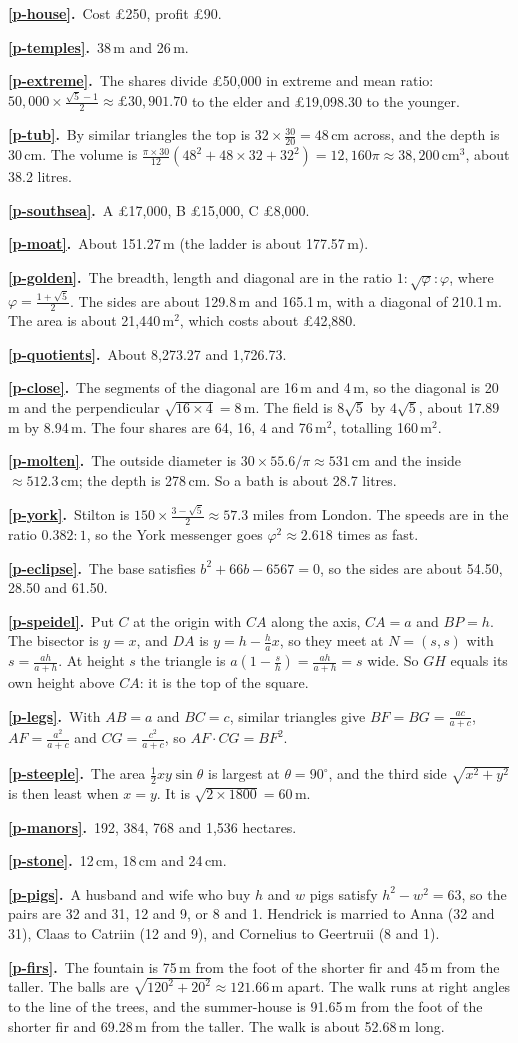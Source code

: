 \documentclass[11pt,a4paper]{article}
\newcommand{\ans}[2]{\par\smallskip\noindent\textbf{\ref{#1}.}\ #2}
\begin{document}
\ans{p-house}{Cost £250, profit £90.}
\ans{p-temples}{38\,m and 26\,m.}
\ans{p-extreme}{The shares divide £50,000 in extreme and mean ratio:
$50{,}000\times\tfrac{\sqrt5-1}{2} \approx £30{,}901.70$ to the elder and £19,098.30 to the
younger.}
\ans{p-tub}{By similar triangles the top is $32\times\tfrac{30}{20} = 48$\,cm across, and
the depth is 30\,cm. The volume is
$\tfrac{\pi\times30}{12}(48^2+48\times32+32^2) = 12{,}160\pi \approx 38{,}200$\,cm$^3$,
about 38.2 litres.}
\ans{p-southsea}{A £17,000, B £15,000, C £8,000.}
\ans{p-moat}{About 151.27\,m (the ladder is about 177.57\,m).}
\ans{p-golden}{The breadth, length and diagonal are in the ratio $1:\sqrt\varphi:\varphi$,
where $\varphi = \tfrac{1+\sqrt5}{2}$. The sides are about 129.8\,m and 165.1\,m, with a
diagonal of 210.1\,m. The area is about 21,440\,m$^2$, which costs about £42,880.}
\ans{p-quotients}{About 8,273.27 and 1,726.73.}
\ans{p-close}{The segments of the diagonal are 16\,m and 4\,m, so the diagonal is
20\,m and the perpendicular $\sqrt{16\times4} = 8$\,m. The field is $8\sqrt5$ by
$4\sqrt5$, about 17.89\,m by 8.94\,m. The four shares are 64, 16, 4 and 76\,m$^2$,
totalling 160\,m$^2$.}
\ans{p-molten}{The outside diameter is $30\times55.6/\pi \approx 531$\,cm and the inside
$\approx 512.3$\,cm; the depth is 278\,cm. So a bath is about 28.7 litres.}
\ans{p-york}{Stilton is $150\times\tfrac{3-\sqrt5}{2} \approx 57.3$ miles from London. The
speeds are in the ratio $0.382:1$, so the York messenger goes $\varphi^2 \approx 2.618$
times as fast.}
\ans{p-eclipse}{The base satisfies $b^2+66b-6567 = 0$, so the sides are about 54.50,
28.50 and 61.50.}
\ans{p-speidel}{Put $C$ at the origin with $CA$ along the axis, $CA = a$ and $BP = h$. The
bisector is $y = x$, and $DA$ is $y = h - \tfrac{h}{a}x$, so they meet at $N = (s,s)$ with
$s = \tfrac{ah}{a+h}$. At height $s$ the triangle is $a\left(1-\tfrac{s}{h}\right) =
\tfrac{ah}{a+h} = s$ wide. So $GH$ equals its own height above $CA$: it is the top of the
square.}
\ans{p-legs}{With $AB = a$ and $BC = c$, similar triangles give
$BF = BG = \tfrac{ac}{a+c}$, $AF = \tfrac{a^2}{a+c}$ and $CG = \tfrac{c^2}{a+c}$, so
$AF\cdot CG = BF^2$.}
\ans{p-steeple}{The area $\tfrac12 xy\sin\theta$ is largest at $\theta = 90^\circ$, and
the third side $\sqrt{x^2+y^2}$ is then least when $x = y$. It is $\sqrt{2\times1800} =
60$\,m.}
\ans{p-manors}{192, 384, 768 and 1,536 hectares.}
\ans{p-stone}{12\,cm, 18\,cm and 24\,cm.}
\ans{p-pigs}{A husband and wife who buy $h$ and $w$ pigs satisfy $h^2 - w^2 = 63$, so the
pairs are 32 and 31, 12 and 9, or 8 and 1. Hendrick is married to Anna (32 and 31),
Claas to Catriin (12 and 9), and Cornelius to Geertruii (8 and 1).}
\ans{p-firs}{The fountain is 75\,m from the foot of the shorter fir and 45\,m from the
taller. The balls are $\sqrt{120^2+20^2} \approx 121.66$\,m apart. The walk runs at right
angles to the line of the trees, and the summer-house is 91.65\,m from the foot of the
shorter fir and 69.28\,m from the taller. The walk is about 52.68\,m long.}
\end{document}
